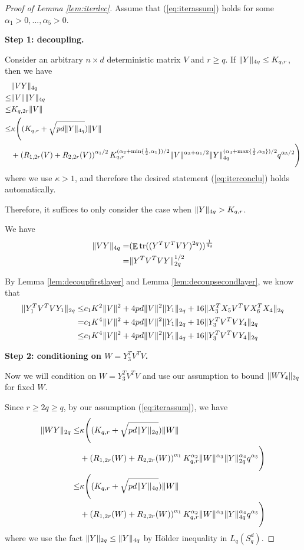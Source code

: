 \documentclass[11pt]{amsart}
\numberwithin{equation}{section}
\numberwithin{equation}{section}
\DeclareMathOperator{\E}{\mathbb{E}}
\DeclareMathOperator*{\tr}{tr}
\DeclarePairedDelimiter{\norm}{\lVert}{\rVert}
\begin{document}
\begin{proof}[Proof of Lemma \ref{lem:iterdec}]


Assume that (\ref{eq:iterassum}) holds for some $\alpha_1>0,...,\alpha_5>0$.

\textbf{Step 1: decoupling.}


Consider an arbitrary $n \times d$ deterministic matrix $V$ and $r \ge q$. If $\norm{Y}_{4q} \le K_{q,r}$, then we have
\begin{align*}
    &\norm{VY}_{4q} \\\le& 
    \norm{V}\norm{Y}_{4q}
    \\ \le & K_{q,2r}\norm{V}
    \\ \le &\kappa \Bigg((K_{q,r}+\sqrt{pd\norm{Y}_{4q}})\norm{V} \\&+ \left(R_{1,2r}(V)+R_{2,2r}(V)\right)^{\alpha_1/2}K_{q,r}^{(\alpha_2+\min\{\frac{1}{2},\alpha_1\})/2}\norm{V}^{\alpha_3+\alpha_1/2} \norm{Y}_{4q}^{(\alpha_4+\max\{\frac{1}{2},\alpha_3\})/2}q^{\alpha_5/2}\Bigg)
\end{align*}
where we use $\kappa>1$, and therefore the desired statement (\ref{eq:iterconclu}) holds automatically.

Therefore, it suffices to only consider the case when $\norm{Y}_{4q} > K_{q,r}$.


We have
\begin{align*}
    \norm{VY}_{4q}=&(\E\tr((Y^TV^TVY)^{2q}))^{\frac{1}{4q}}
\\=&\norm{Y^TV^TVY}_{2q}^{1/2}
\end{align*}

By Lemma \ref{lem:decoupfirstlayer} and Lemma \ref{lem:decoupsecondlayer}, we know that
\begin{align*}
    \norm{Y_1^TV^TVY_1}_{2q} \le& c_1 K^2 \norm{V}^2 + 4pd\norm{V}^2 \norm{Y_1}_{2q} + 16 \norm{X_3^TX_5V^TVX_6^TX_4}_{2q}
    \\=& c_1 K^4 \norm{V}^2 + 4pd\norm{V}^2 \norm{Y_1}_{2q}+ 16 \norm{Y_3^TV^TVY_4}_{2q}
    \\ \le & c_1 K^4 \norm{V}^2 + 4pd\norm{V}^2 \norm{Y_1}_{4q}+ 16 \norm{Y_3^TV^TVY_4}_{2q}
\end{align*}



\textbf{Step 2: conditioning on $W=Y_3^TV^TV$.}

Now we will condition on $W=Y_3^TV^TV$ and use our assumption to bound $\norm{WY_4}_{2q}$ for fixed $W$.

Since $r \ge 2q \ge q$, by our assumption (\ref{eq:iterassum}), we have
    \begin{align*}
    \norm{WY}_{2q} \le & \kappa \Bigg((K_{q,r}+\sqrt{pd\norm{Y}_{2q}})\norm{W} \\&+ \left(R_{1,2r}(W)+R_{2,2r}(W)\right)^{\alpha_1}K_{q,r}^{\alpha_2}\norm{W}^{\alpha_3} \norm{Y}_{2q} ^{\alpha_4}q^{\alpha_5}\Bigg)
    \\\le & \kappa \Bigg((K_{q,r}+\sqrt{pd\norm{Y}_{4q}})\norm{W} \\&+ \left(R_{1,2r}(W)+R_{2,2r}(W)\right)^{\alpha_1}K_{q,r}^{\alpha_2}\norm{W}^{\alpha_3} \norm{Y}_{4q} ^{\alpha_4}q^{\alpha_5}\Bigg)
\end{align*}
where we use the fact $\norm{Y}_{2q} \le \norm{Y}_{4q}$ by H\"older inequality in $L_q(S_q^d)$.


\end{proof}
\end{document}
